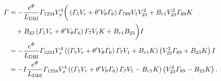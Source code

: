 \documentclass[11pt]{article}
\let\oldPhi=\Phi
\let\oldGamma=\Gamma
\let\oldPi=\Pi
\renewcommand{\Phi}{\mathnormal{\oldPhi}}
\renewcommand{\Gamma}{\mathnormal{\oldGamma}}
\renewcommand{\Pi}{\mathnormal{\oldPi}}
\begin{document}
\begin{align}
\Gamma & = -\frac{e^{\Phi}}{L_{\text{DBI}}}\Gamma_{1234}V_x^4\bigg(
\left(\Gamma_5 V_r  + \theta' V_\theta \Gamma_6\right)\Gamma_{789}V_1 V_{23}^2
+B_{r1}V_{23}^2\Gamma_{89} K\nonumber\\
&~~~+B_{23}\left(\Gamma_5 V_r  + \theta' V_\theta \Gamma_6\right)\Gamma_{7}V_1 K
+B_{r1}B_{23}
\bigg)I\nonumber\\
& = -\frac{e^{\Phi}}{L_{\text{DBI}}}\Gamma_{1234}V_x^4
\left(\left(\Gamma_5 V_r  + \theta' V_\theta \Gamma_6\right)\Gamma_{7}V_1
+B_{r1}K\right)\left(V_{23}^2\Gamma_{89}  + B_{23} K\right)
I\nonumber\\
& = -I\frac{e^{\Phi}}{L_{\text{DBI}}}\Gamma_{1234}V_x^4
\left(\left(\Gamma_5 V_r  + \theta' V_\theta \Gamma_6\right)\Gamma_{7}V_1
-B_{r1}K\right)\left(V_{23}^2\Gamma_{89}  - B_{23} K\right).
\end{align}
%
%
%
%
\end{document}

